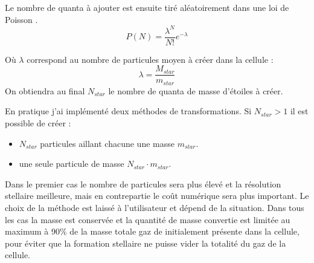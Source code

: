 Le nombre de quanta à ajouter est ensuite tiré aléatoirement dans une loi de Poisson \citep{rasera_history_2006}.
\begin{equation}
	P(N) = \frac{\lambda^N}{N!} e^{-\lambda}
\end{equation}

Où $\lambda$ correspond au nombre de particules moyen à créer dans la cellule :
\begin{equation}
\lambda = \frac{ M_{star}}{m_{star}}
\end{equation}
On obtiendra au final $N_{star}$ le nombre de quanta de masse d'étoiles à créer.

En pratique j'ai implémenté deux méthodes de transformations.
Si  $N_{star}>1$ il est possible de créer : 
\begin{itemize}
\item  $N_{star}$ particules aillant chacune une masse  $m_{star}$.
\item une seule particule de masse  $N_{star} \cdot m_{star}$.
\end{itemize}

Dans le premier cas le nombre de particules sera plus élevé et la résolution stellaire meilleure, mais en contrepartie le coût numérique sera plus important.
Le choix de la méthode est laissé à l'utilisateur et dépend de la situation.
Dans tous les cas la masse est conservée et la quantité de masse convertie est limitée au maximum à 90\% de la masse totale gaz de initialement présente dans la cellule, pour éviter que la formation stellaire ne puisse vider la totalité du gaz de la cellule.



